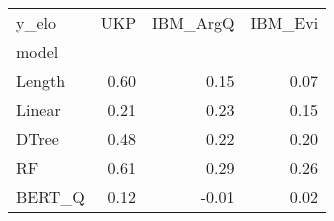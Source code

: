 \begin{tabular}{lrrr}
\toprule
y\_elo &   UKP &  IBM\_ArgQ &  IBM\_Evi \\
model  &       &           &          \\
\midrule
Length &  0.60 &      0.15 &     0.07 \\
Linear &  0.21 &      0.23 &     0.15 \\
DTree  &  0.48 &      0.22 &     0.20 \\
RF     &  0.61 &      0.29 &     0.26 \\
BERT\_Q &  0.12 &     -0.01 &     0.02 \\
\bottomrule
\end{tabular}
